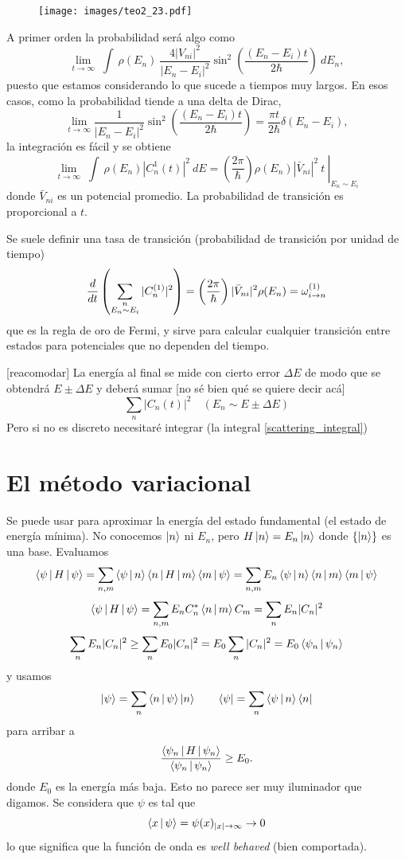 \documentclass[10pt,oneside]{CBFT_book}
\begin{document}
\begin{figure}[htb]
	\begin{center}
	\texttt{[image: images/teo2\_23.pdf]}
	\end{center}
	\caption{}
\end{figure} 

A primer orden la probabilidad será algo como
\[
	\lim_{t\to\infty} \; \int \: \rho(E_n) \: \frac{4|V_{ni}|^2}{| E_n - E_i|^2}
	\sin^2\left(\frac{(E_n - E_i)t}{2\hbar}\right) \: dE_n,
\]
puesto que estamos considerando lo que sucede a tiempos muy largos.
En esos casos, como la probabilidad tiende a una delta de Dirac, 
\[
	\lim_{t\to\infty} \frac{1}{| E_n - E_i|^2}
	\sin^2\left(\frac{(E_n - E_i)t}{2\hbar}\right) = \frac{\pi t}{2\hbar} \delta(E_n - E_i),
\]
la integración es fácil y se obtiene
\[
	\lim_{t\to\infty} \; \int \: \rho(E_n) |C^1_n(t)|^2 \: dE = 
	\left.\left(\frac{2\pi}{\hbar}\right) \rho(E_n) |\bar{V}_{ni}|^2 \: t \: \right|_{E_n\sim E_i}
\]
donde $\bar{V}_{ni}$ es un potencial promedio. La probabilidad de transición es proporcional a $t$. 

Se suele definir una tasa de transición (probabilidad de transición por unidad de tiempo)
\[
	\frac{d^{\hspace{-0.05em}} {}}{d {t}^{\hspace{-0.05em}}}\left( \sum_{\substack{n \\ E_n\sim E_i}} |C_n^{(1)}|^2 \right) =
	\left(\frac{2\pi}{\hbar}\right)	|\bar{V}_{ni}|^2 \rho(E_n) = \omega_{i\to n}^{(1)}
\]
que es la regla de oro de Fermi, y sirve para calcular cualquier transición entre estados
para potenciales que no dependen del tiempo.

[reacomodar]
La energía al final se mide con cierto error $\Delta E$ de modo que se obtendrá $E \pm \Delta E$ y 
deberá sumar [no sé bien qué se quiere decir acá]
\[
	\sum_n | C_n(t) |^2 \quad (E_n \sim E \pm \Delta E)
\]
Pero si no es discreto necesitaré integrar (la integral \eqref{scattering_integral})

\section{El método variacional}

Se puede usar para aproximar la energía del estado fundamental (el estado de energía mínima).
No conocemos $\Ket{n}$ ni $E_n$, pero $ H \Ket{n} = E_n \Ket{n}$ donde $\{ \Ket{n} \}$ es
una base.
Evaluamos
\[
	\Braket{\psi|H|\psi} = \sum_{n,m}\Braket{\psi|n}\Braket{n|H|m}\Braket{m|\psi} =
		\sum_{n,m} E_n \Braket{\psi|n}\Braket{n|m}\Braket{m|\psi} 
\]
\[
	\Braket{\psi|H|\psi} = \sum_{n,m} E_n C_n^*\Braket{n|m}C_m = \sum_{n} E_n|C_n|^2
\]
\[
	\sum_{n} E_n|C_n|^2 \geq \sum_n E_0|C_n|^2 = E_0 \sum_n |C_n|^2 = E_0 \Braket{\psi_n|\psi_n}
\]
y usamos 
\[
\Ket{\psi} = \sum_n \Braket{n|\psi}\Ket{n} \qquad \Bra{\psi} = \sum_n \Braket{\psi|n}\Bra{n} 
\]
para arribar a
\[
	\frac{\Braket{\psi_n|H|\psi_n}}{\Braket{\psi_n|\psi_n}} \geq E_0.
\]
donde $E_0$ es la energía más baja. Esto no parece ser muy iluminador que digamos.
Se considera que $\psi$ es tal que 
\[
	\Braket{x|\psi} = \psi(x)_{|x|\to\infty} \to 0
\]
lo que significa que la función de onda es {\it well behaved} (bien comportada).
\end{document}
